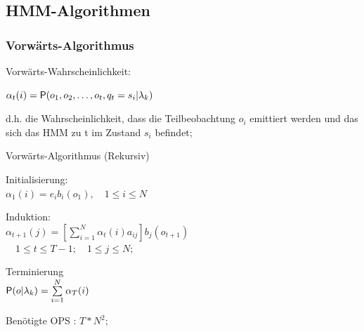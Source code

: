 \documentclass[german,color,6pt]{latex4ei/latex4ei_sheet}
\begin{document}
\subsection{HMM-Algorithmen}
\begin{sectionbox}
\subsubsection{Vorwärts-Algorithmus}
Vorwärts-Wahrscheinlichkeit:

$\alpha_t (i) = \P(o_1, o_2, \dots , o_t , q_t = s_i | \lambda_k)$

d.h. die Wahrscheinlichkeit, dass die Teilbeobachtung $o_i$ emittiert werden und das sich das HMM zu t im Zustand $s_i$ befindet; 

\begin{cookbox}{Vorwärts-Algorithmus (Rekursiv)}
	\item Initialisierung: \\
		$\alpha_1(i) = e_i b_i (o_1), \quad 1 \leq i \leq N $\\
	\item Induktion: \\
		$ \alpha_{t+1} (j) = \left[ \sum\limits_{i=1}^N{\alpha_t (i) a_{ij}} \right] b_j (o_{t+1}) $\\
		$  \quad 1 \leq t \leq T-1; \quad 1 \leq j \leq N;$\\
	\item Terminierung \\
		$\P(o|\lambda_k )= \sum\limits_{i=1}^N \alpha _T (i)$\\
\end{cookbox}
Benötigte OPS : $T * N^2$; 
\end{sectionbox}
\end{document}
